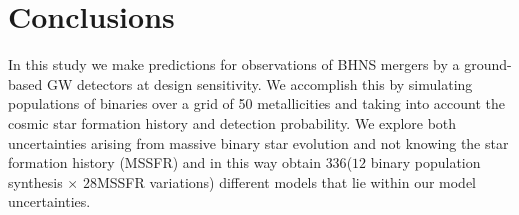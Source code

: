\documentclass[twocolumn]{aastex63}
\newcommand\bhnsSingle{BHNS\xspace}
\newcommand{\Nmodels}{\ensuremath{336}\xspace}
\newcommand{\NmodelsBPS}{\ensuremath{12}\xspace}
\newcommand{\NmodelsMSSFR}{\ensuremath{28}\xspace}
\begin{document}

%
%
%
%



\section{Conclusions}
\label{sec:conclusions}
%
In this study we make predictions for  observations 
of \bhnsSingle mergers by a ground-based  \ac{GW} detectors at design sensitivity. We accomplish this by simulating populations of binaries over a grid of 50 metallicities and taking into account the cosmic star formation history and detection probability. We explore both uncertainties arising  from massive binary star evolution and not knowing the star formation history (\ac{MSSFR}) and in this way obtain \Nmodels (\NmodelsBPS binary population synthesis $\times$ \NmodelsMSSFR \ac{MSSFR} variations) different models that lie within our model uncertainties. 
\end{document}
